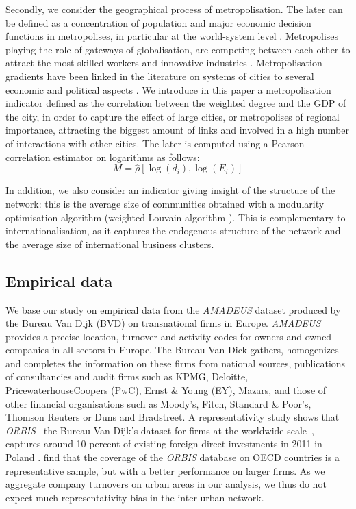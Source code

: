 \documentclass[10pt,letterpaper]{article}
\begin{document}
Secondly, we consider the geographical process of metropolisation. The later can be defined as a concentration of population and major economic decision functions in metropolises, in particular at the world-system level \cite{sassen1991global}. Metropolises playing the role of gateways of globalisation, are competing between each other to attract the most skilled workers and innovative industries \cite{RozenblatPumain2007}. Metropolisation gradients have been linked in the literature on systems of cities to several economic and political aspects \cite{RozenblatPumain2018} \cite{PumainRozenblat2019} \cite{Zdanowskaetal2020}. We introduce in this paper a metropolisation indicator defined as the correlation between the weighted degree and the GDP of the city, in order to capture the effect of large cities, or metropolises of regional importance, attracting the biggest amount of links and involved in a high number of interactions with other cities.  The later is computed using a Pearson correlation estimator on logarithms as follows:
\begin{equation}
    M = \hat{\rho} \left[\log (d_i) , \log (E_i) \right]
\end{equation}

In addition, we also consider an indicator giving insight of the structure of the network: this is the average size of communities obtained with a modularity optimisation algorithm (weighted Louvain algorithm \cite{blondel2008fast}). This is complementary to internationalisation, as it captures the endogenous structure of the network and the average size of international business clusters.


\subsection*{Empirical data}

We base our study on empirical data from the \emph{AMADEUS} dataset produced by the Bureau Van Dijk (BVD) on transnational firms in Europe. \emph{AMADEUS} provides a precise location, turnover and activity codes for owners and owned companies in all sectors in Europe. The Bureau Van Dick gathers, homogenizes and completes the information on these firms from national sources, publications of consultancies and audit firms such as KPMG, Deloitte, PricewaterhouseCoopers (PwC), Ernst \& Young (EY), Mazars, and those of other financial organisations such as Moody's, Fitch, Standard \& Poor's, Thomson Reuters or Duns and Bradstreet. A representativity study shows that \emph{ORBIS} --the Bureau Van Dijk's dataset for firms at the worldwide scale--, captures around 10 percent of existing foreign direct investments in 2011 in Poland \cite{Zdanowska2018}. \cite{bajgar2020coverage} find that the coverage of the \emph{ORBIS} database on OECD countries is a representative sample, but with a better performance on larger firms. As we aggregate company turnovers on urban areas in our analysis, we thus do not expect much representativity bias in the inter-urban network.
\end{document}
